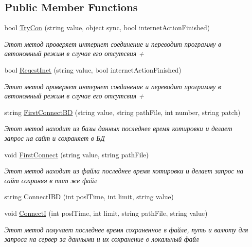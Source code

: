 \subsection*{Public Member Functions}
\begin{DoxyCompactItemize}
\item 
bool \hyperlink{class_client_1_1_internet_a9dd75df149ccd3f37a7808371734df6e}{Try\+Con} (string value, object sync, bool internet\+Action\+Finished)
\begin{DoxyCompactList}\small\item\em Этот метод проверяет интернет соединение и переводит программу в автономный режим в случае его отсутсвия + \end{DoxyCompactList}\item 
bool \hyperlink{class_client_1_1_internet_ac5dffd376bcb63c31d30e676c42ea16b}{Reqest\+Inet} (string value, bool internet\+Action\+Finished)
\begin{DoxyCompactList}\small\item\em Этот метод проверяет интернет соединение и переводит программу в автономный режим в случае его отсутсвия + \end{DoxyCompactList}\item 
string \hyperlink{class_client_1_1_internet_acb1ebd5d0e24109a5bf17ffc40d3b4d9}{First\+Connect\+BD} (string value, string path\+File, int number, string patch)
\begin{DoxyCompactList}\small\item\em Этот метод находит из базы данных последнее время котировки и делает запрос на сайт и сохраняет в БД \end{DoxyCompactList}\item 
void \hyperlink{class_client_1_1_internet_a7264aa476ec385c1cb78e21e6c011f18}{First\+Connect} (string value, string path\+File)
\begin{DoxyCompactList}\small\item\em Этот метод находит из файла последнее время котировки и делает запрос на сайт сохраняя в тот же файл \end{DoxyCompactList}\item 
string \hyperlink{class_client_1_1_internet_afeff19924124e7ca32b7509d4b055610}{Connect\+I\+BD} (int posl\+Time, int limit, string value)
\item 
void \hyperlink{class_client_1_1_internet_a1cd19828884f2508d44f8af4a2975ace}{ConnectI} (int posl\+Time, int limit, string path\+File, string value)
\begin{DoxyCompactList}\small\item\em Этот метод получает последнее время сохраненное в файле, путь и валюту для запроса на сервер за данными и их сохранение в локальный файл \end{DoxyCompactList}\item 

\end{DoxyCompactItemize}
